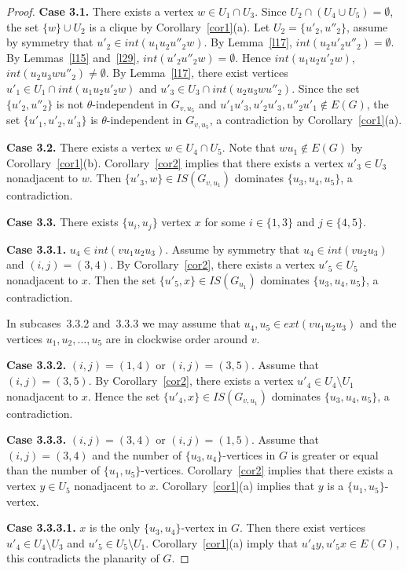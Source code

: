 \documentclass[12pt]{article}
\begin{document}
\begin{proof}
\textbf{Case 3.1.} There exists a vertex $w \in U_1 \cap U_3$. Since $U_2 \cap (U_4 \cup U_5) = \emptyset$, the set $\{w\} \cup U_2$ is a clique by Corollary~\ref{cor1}(a). Let $U_2 = \{u'_2,u''_2\}$, assume by symmetry that $u'_2 \in int(u_1u_2u''_2w)$. By Lemma~\ref{l17}, $int(u_2u'_2u''_2) = \emptyset$. By Lemmas~\ref{l15} and~\ref{l29}, $int(u'_2u''_2w) = \emptyset$. Hence $int(u_1u_2u'_2w)$,  $int(u_2u_3wu''_2) \neq \emptyset$. By Lemma~\ref{l17}, there exist vertices $u'_1 \in U_1 \cap int(u_1u_2u'_2w)$ and $u'_3 \in U_3 \cap  int(u_2u_3wu''_2)$. Since the set $\{u'_2,u''_2\}$ is not $\theta$-independent in $G_{v,u_5}$ and $u'_1u'_3,u'_2u'_3,u''_2u'_1 \notin E(G)$, the set $\{u'_1,u'_2,u'_3\}$ is $\theta$-independent in $G_{v,u_5}$, a contradiction by Corollary~\ref{cor1}(a).

\textbf{Case 3.2.} There exists a vertex $w \in U_4 \cap U_5$. Note that $wu_1 \notin E(G)$ by Corollary~\ref{cor1}(b). Corollary~\ref{cor2} implies that there exists a vertex $u'_3 \in U_3$ nonadjacent to $w$. Then $\{u'_3,w\} \in IS(G_{v,u_1})$ dominates $\{u_3,u_4,u_5\}$, a contradiction.

\textbf{Case 3.3.} There exists $\{u_i,u_j\}$ vertex $x$ for some $i \in \{1,3\}$ and $j \in \{4,5\}$. 

\textbf{Case 3.3.1.} $u_4 \in int(vu_1u_2u_3)$. Assume by symmetry that $u_4 \in int(vu_2u_3)$ and $(i,j) = (3,4)$. By Corollary~\ref{cor2}, there exists a vertex $u'_5 \in U_5$ nonadjacent to $x$. Then the set $\{u'_5,x\} \in IS(G_{u_1})$ dominates $\{u_3,u_4,u_5\}$, a contradiction. 

In subcases~3.3.2 and~3.3.3 we may assume that $u_4,u_5 \in ext(vu_1u_2u_3)$ and the vertices $u_1,u_2,\ldots,u_5$ are in clockwise order around $v$.

\textbf{Case 3.3.2.} $(i,j) = (1,4)$ or $(i,j) = (3,5)$. Assume that $(i,j) = (3,5)$. By Corollary~\ref{cor2}, there exists a vertex $u'_4 \in U_4 \setminus U_1$ nonadjacent to $x$. Hence the set $\{u'_4,x\} \in IS(G_{v,u_1})$ dominates $\{u_3,u_4,u_5\}$, a contradiction.

\textbf{Case 3.3.3.} $(i,j) = (3,4)$ or $(i,j) = (1,5)$. Assume that $(i,j) = (3,4)$ and the number of $\{u_3,u_4\}$-vertices in $G$ is greater or equal than the number of $\{u_1,u_5\}$-vertices. Corollary~\ref{cor2} implies that there exists a vertex $y \in U_5$ nonadjacent to $x$. Corollary~\ref{cor1}(a) implies that $y$ is a $\{u_1,u_5\}$-vertex. 

\textbf{Case 3.3.3.1.} $x$ is the only $\{u_3,u_4\}$-vertex in $G$. Then there exist vertices $u'_4 \in U_4 \setminus U_3$ and $u'_5 \in U_5 \setminus U_1$. Corollary~\ref{cor1}(a) imply that $u'_4y,u'_5x \in E(G)$, this contradicts the planarity of $G$.


\end{proof}
\end{document}
